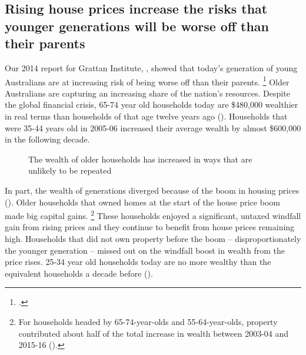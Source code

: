 \subsection{Rising house prices increase the risks that younger generations will be worse off than their parents}\label{subsec:rising-house-prices-increase-the-risks-that-younger-generations-will-be-worse-off-than-their-parents}

Our 2014 report for Grattan Institute, , showed that today's generation of young Australians are at increasing risk of being worse off than their parents.%
	\footcite{DaleyWoodWeidmannHarrison-2014-Wealth-of-generations}
Older Australians are capturing an increasing share of the nation's resources.
Despite the global financial crisis, 65-74 year old households today are \$480,000 wealthier in real terms than households of that age twelve years ago ().
Households that were 35-44 years old in 2005-06 increased their average wealth by almost \$600,000 in the following decade.
\oneraggedpage
    
\begin{figure}
\caption{The wealth of older households has increased in ways that are unlikely to be repeated}\label{fig:net-wealth-age}
\end{figure}

In part, the wealth of generations diverged because of the boom in housing prices ().
Older households that owned homes at the start of the house price boom made big capital gains.%
    \footnote{For households headed by 65-74-year-olds and 55-64-year-olds, property contributed about half of the total increase in wealth between 2003-04 and 2015-16 (\textcite{WoodWiltshire2017WoG}).}
These households enjoyed a significant, untaxed windfall gain from rising prices and they continue to benefit from house prices remaining high.
Households that did not own property before the boom -- disproportionately the younger generation -- missed out on the windfall boost in wealth from the price rises.
25-34 year old households today are no more wealthy than the equivalent households a decade before ().%

